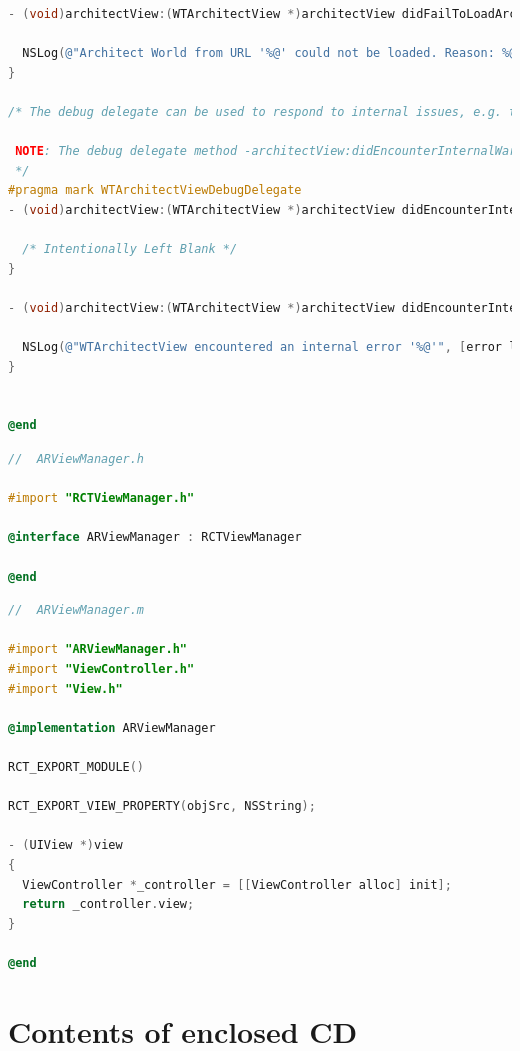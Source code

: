\documentclass[thesis=M,english]{FITthesis}[2012/10/20]
\begin{document}
\begin{lstlisting}[language=C]
- (void)architectView:(WTArchitectView *)architectView didFailToLoadArchitectWorldNavigation:(WTNavigation *)navigation withError:(NSError *)error {
  
  NSLog(@"Architect World from URL '%@' could not be loaded. Reason: %@", navigation.originalURL, [error localizedDescription]);
}

/* The debug delegate can be used to respond to internal issues, e.g. the user declined camera or GPS access.
 
 NOTE: The debug delegate method -architectView:didEncounterInternalWarning is currently not used.
 */
#pragma mark WTArchitectViewDebugDelegate
- (void)architectView:(WTArchitectView *)architectView didEncounterInternalWarning:(WTWarning *)warning {
  
  /* Intentionally Left Blank */
}

- (void)architectView:(WTArchitectView *)architectView didEncounterInternalError:(NSError *)error {
  
  NSLog(@"WTArchitectView encountered an internal error '%@'", [error localizedDescription]);
}


@end
\end{lstlisting}

\clearpage
\begin{lstlisting}[language=C]
//  ARViewManager.h

#import "RCTViewManager.h"

@interface ARViewManager : RCTViewManager

@end

\end{lstlisting}

\begin{lstlisting}[language=C]
//  ARViewManager.m

#import "ARViewManager.h"
#import "ViewController.h"
#import "View.h"

@implementation ARViewManager

RCT_EXPORT_MODULE()

RCT_EXPORT_VIEW_PROPERTY(objSrc, NSString);

- (UIView *)view
{
  ViewController *_controller = [[ViewController alloc] init];
  return _controller.view;
}

@end
\end{lstlisting}

\chapter{Contents of enclosed CD}


\begin{figure}
\end{figure}
\end{document}
